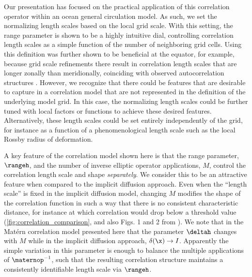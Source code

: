 \documentclass[alpha-refs]{wiley-article}
\begin{document}
Our presentation has focused on the practical application of this
correlation operator within an ocean general circulation model.
As such, we set the normalizing length scales based on the local grid
scale.
With this setting, the range parameter is shown to be a highly intuitive dial,
controlling correlation length scales as a simple function of the number of
neighboring grid cells.
Using this definition was further shown to be beneficial at the equator, for
example, because grid scale refinements there result in correlation length
scales that are longer zonally than meridionally, coinciding with observed
autocorrelation structures
\citep{meyers_space_1991}.
However, we recognize that there could be features that are desirable to capture
in a correlation model that are not represented in the definition of the
underlying model grid.
In this case, the normalizing length scales could be further tuned with
local factors or functions to achieve these desired features.
Alternatively, these length scales could be set entirely independently of
the grid, for instance as a function of a phenomenological length scale such as
the local Rossby radius of deformation.

A key feature of the correlation model shown here is that the range parameter,
$\rangeh$, and the number of inverse elliptic operator applications, $M$,
control the correlation length scale and shape \textit{separately}.
We consider this to be an attractive feature when compared to the implicit
diffusion approach.
Even when the ``length scale'' is fixed in the implicit diffusion model, changing $M$
modifies the shape of the correlation function in such a way that there is no
consistent characteristic distance, for instance at which correlation would drop below a
threshold value
(\cref{fig:correlation_comparison}, and also Figs. 1 and 2 from
\citet{guillet_modelling_2019}).
We note that in the Mat\'ern correlation model presented here that the parameter
$\deltah$ changes with $M$ while in the implicit diffusion approach,
$\delta(\x) \rightarrow I$.
Apparently the simple variation in this parameter is enough to balance the
multiple applications of $\maternop^{-1}$, such that the resulting correlation
structure maintains a consistently identifiable length scale via $\rangeh$.
\end{document}

